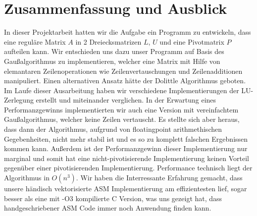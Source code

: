 \documentclass[course=erap]{aspdoc}
\begin{document}
\section{Zusammenfassung und Ausblick}
In dieser Projektarbeit hatten wir die Aufgabe ein Programm zu entwickeln, dass eine reguläre Matrix $A$ in 2 Dreiecksmatrizen
$L$, $U$ und eine Pivotmatrix $P$ aufteilen kann. Wir entschieden uns dazu unser Programm auf Basis des Gaußalgorithmus 
zu implementieren, welcher eine Matrix mit Hilfe von elemantaren Zeilenoperationen wie Zeilenvertauschungen und 
Zeilenadditionen manipuliert. Einen alternativen Ansatz hätte der Dolittle Algorithmus geboten. Im Laufe dieser Ausarbeitung 
haben wir verschiedene Implementierungen der LU-Zerlegung erstellt und miteinander verglichen. In der Erwartung eines 
Performanzgewinns implementierten wir auch eine Version mit vereinfachtem Gaußalgorithmus, welcher keine Zeilen vertauscht. 
Es stellte sich aber heraus, dass dann der Algorithmus, aufgrund von floatingpoint arithmethischen Gegebenheiten, nicht 
mehr stabil ist und es so zu komplett falschen Ergebnissen kommen kann. Außerdem ist der Performanzgewinn dieser Implementierung nur marginal und somit hat eine 
nicht-pivotisierende Implementierung keinen Vorteil gegenüber einer pivotisierenden Implementierung. Performance technisch 
liegt der Algorithmus in $O(n^3)$. Wir haben die Interressante Erfahrung gemacht, dass unsere händisch vektorisierte ASM 
Implementierung am effizientesten lief, sogar besser als eine mit -O3 kompilierte C Version, was uns gezeigt hat, 
dass handgeschriebener ASM Code immer noch Anwendung finden kann. 


{}
\end{document}
